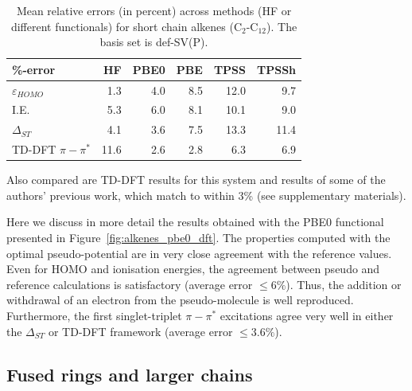 \documentclass[aip]{revtex4-1}
\begin{document}
\begin{table}[ht]
\caption{Mean relative errors (in percent) across methods (HF or different functionals)
for short chain alkenes  (C\(_{2}\)-C\(_{12}\)).
The basis set is def-SV(P).}
\begin{tabular}{l r r r r r }
\hline \hline
\%-error                & HF & PBE0 & PBE & TPSS & TPSSh \\
\hline
$\varepsilon_{HOMO}$    & 1.3 & 4.0 & 8.5 & 12.0 &  9.7 \\
I.E.                    & 5.3 & 6.0 & 8.1 & 10.1 &  9.0 \\
$\Delta_{ST}$           & 4.1 & 3.6 & 7.5 & 13.3 & 11.4 \\
TD-DFT $\pi-\pi^*$       & 11.6 & 2.6 & 2.8 &  6.3 &  6.9 \\ 
\hline\hline
\end{tabular}
\label{table:alkene_errors}
\end{table}

Also compared are TD-DFT results for this system and results of some of the authors' previous work,
which match to within 3\% (see supplementary materials).\cite{drujon_pseudopotentials_2013}

Here we discuss in more detail the results obtained with the PBE0 functional presented
in Figure~\ref{fig:alkenes_pbe0_dft}.
The properties computed with the optimal pseudo-potential are in very close agreement with the reference values.
Even for HOMO and ionisation energies, the agreement between pseudo and reference calculations is satisfactory
(average error $\le 6\%$).
Thus, the addition or withdrawal of an electron from the pseudo-molecule is well reproduced.
Furthermore, the first singlet-triplet $\pi-\pi^*$ excitations agree very well in either
the $\Delta_{ST}$ or TD-DFT framework (average error $\le 3.6\%$).

\subsection{Fused rings and larger chains}
\end{document}
